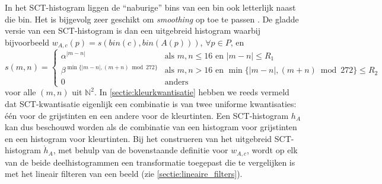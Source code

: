 In het SCT-histogram liggen de ``naburige'' bins van een bin ook letterlijk naast
die bin. Het is bijgevolg zeer geschikt om
\emph{smoothing} op toe te passen \cite{sural:perceptually_smooth_histogram}. De gladde versie van
een SCT-histogram is dan een uitgebreid histogram waarbij bijvoorbeeld 
$w_{A,c}(p)=s(bin(c),bin(A(p)))$, $\forall p \in P$, en
\begin{displaymath}
s(m,n)=
\begin{cases}
\alpha^{|m-n|} & \textrm{als } m, n \le 16 \textrm{ en } |m-n| \le R_1 \\
\beta^{\min\{|m-n|, (m+n) \bmod 272\}} & \textrm{als } m, n > 16 \textrm{ en } \min\{|m-n|, (m+n) \bmod 272\} \le R_2 \\ 
0 & \textrm{anders}
\end{cases}
\end{displaymath}
voor alle $(m,n)$ uit $\mathbb{N}^2$. In \ref{sectie:kleurkwantisatie} hebben 
we reeds vermeld dat SCT-kwantisatie eigenlijk een combinatie is van twee 
uniforme kwantisaties: \'e\'en voor de grijstinten en een andere voor de 
kleurtinten. Een SCT-histogram $h_A$ kan dus beschouwd 
worden als de combinatie van een histogram voor grijstinten en een histogram 
voor kleurtinten. 
Bij het construeren van het uitgebreid SCT-histogram $\mathring{h}_A$, met behulp van de bovenstaande 
definitie voor $w_{A,c}$, wordt op elk van de beide deelhistogrammen een 
transformatie toegepast die te vergelijken is met het lineair filteren van
een beeld (zie \ref{sectie:lineaire_filters}). 

